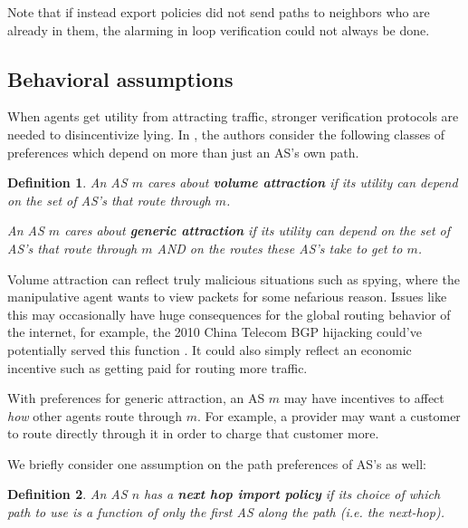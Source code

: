 \documentclass[10pt]{article}
\newtheorem{definition}{Definition}
\begin{document}
    Note that if instead export policies did not send paths to neighbors who are
    already in them, the alarming in loop verification could not always be done.

  \subsection{Behavioral assumptions}
    When agents get utility from attracting traffic, stronger verification
    protocols are needed to disincentivize lying.
    In \cite{Attraction}, the authors consider the following classes of
    preferences which depend on more than just an AS's own path.

    \begin{definition}
      An AS $m$ cares about \textbf{volume attraction} if its utility can depend on
      the set of AS's that route through $m$.

      An AS $m$ cares about \textbf{generic attraction} if its utility can depend on
      the set of AS's that route through $m$ AND on the routes these AS's take to get to $m$.
    \end{definition}

    Volume attraction can reflect truly malicious situations such as spying,
    where the manipulative agent wants to view packets for some nefarious
    reason. Issues like this may occasionally have huge consequences for the
    global routing behavior of the internet, for example, the 2010
    China Telecom BGP hijacking could've potentially served this function
    \cite{ChinaHijack}. It could also simply reflect an economic incentive such as
    getting paid for routing more traffic.

    With preferences for generic attraction, an AS $m$ may have incentives to affect
    \emph{how} other agents route through $m$.
    For example, a provider may want a customer to route directly through it
    in order to charge that customer more.

    We briefly consider one assumption on the path preferences of AS's as well:
    \begin{definition}
      An AS $n$ has a \textbf{next hop import policy} if its choice of which path to use
      is a function of only the first AS along the path (i.e. the next-hop).
    \end{definition}
\end{document}
